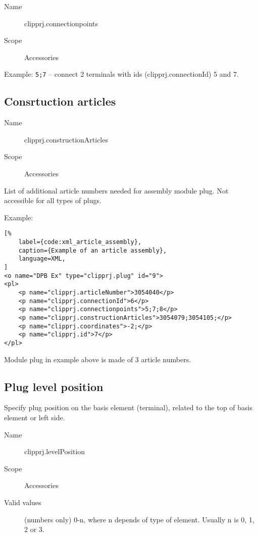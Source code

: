 \documentclass[%
	a4paper,
	oneside,
	listof=numbered,
	parskip=half,
	headsepline=true,
	footsepline=true,
	]{scrbook}
\begin{document}
\begin{description}
	\item[Name] clipprj.connectionpoints
	\item[Scope] Accessories
\end{description}

Example: \verb|5;7| – connect 2 terminals with ids (clipprj.connectionId) 5 and 7.

\subsection{Consrtuction articles}

\begin{description}
	\item[Name] clipprj.constructionArticles
	\item[Scope] Accessories
\end{description}

List of additional article numbers needed for assembly module plug. Not accessible for all types of plugs.

Example:

\begin{lstlisting}[%
	label={code:xml_article_assembly},
	caption={Example of an article assembly},
	language=XML,
]
<o name="DPB Ex" type="clipprj.plug" id="9">
<pl>
	<p name="clipprj.articleNumber">3054040</p>
	<p name="clipprj.connectionId">6</p>
	<p name="clipprj.connectionpoints">5;7;8</p>
	<p name="clipprj.constructionArticles">3054079;3054105;</p>
	<p name="clipprj.coordinates">-2;</p>
	<p name="clipprj.id">7</p>
</pl>
\end{lstlisting}

Module plug in example above is made of 3 article numbers.

\subsection{Plug level position}

Specify plug position on the basis element (terminal), related to the top of
basis element or left side.

\begin{description}
	\item[Name] clipprj.levelPosition
	\item[Scope] Accessories
	\item[Valid values] (numbers only) 0-n, where n depends of type of element. Usually n is 0, 1, 2 or 3.
\end{description}
\end{document}
